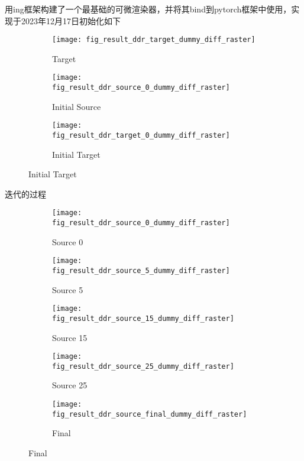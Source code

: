 用ing框架构建了一个最基础的可微渲染器，并将其bind到pytorch框架中使用，实现于2023年12月17日初始化如下

\begin{figure}[H]
    \centering
        \begin{subfigure}{0.3\linewidth}
            \texttt{[image: fig\_result\_ddr\_target\_dummy\_diff\_raster]}
            \caption{Target}
        \end{subfigure}
        \begin{subfigure}{0.3\linewidth}
            \texttt{[image: fig\_result\_ddr\_source\_0\_dummy\_diff\_raster]}
            \caption{Initial Source}
        \end{subfigure}
        \begin{subfigure}{0.3\linewidth}
            \texttt{[image: fig\_result\_ddr\_target\_0\_dummy\_diff\_raster]}
            \caption{Initial Target}
        \end{subfigure}
\end{figure}

迭代的过程

\begin{figure}[H]
    \centering
        \begin{subfigure}{0.19\linewidth}
            \texttt{[image: fig\_result\_ddr\_source\_0\_dummy\_diff\_raster]}
            \caption{Source 0}
        \end{subfigure}
        \begin{subfigure}{0.19\linewidth}
            \texttt{[image: fig\_result\_ddr\_source\_5\_dummy\_diff\_raster]}
            \caption{Source 5}
        \end{subfigure}
        \begin{subfigure}{0.19\linewidth}
            \texttt{[image: fig\_result\_ddr\_source\_15\_dummy\_diff\_raster]}
            \caption{Source 15}
        \end{subfigure}
        \begin{subfigure}{0.19\linewidth}
            \texttt{[image: fig\_result\_ddr\_source\_25\_dummy\_diff\_raster]}
            \caption{Source 25}
        \end{subfigure}
        \begin{subfigure}{0.19\linewidth}
            \texttt{[image: fig\_result\_ddr\_source\_final\_dummy\_diff\_raster]}
            \caption{Final}
        \end{subfigure}
\end{figure}


